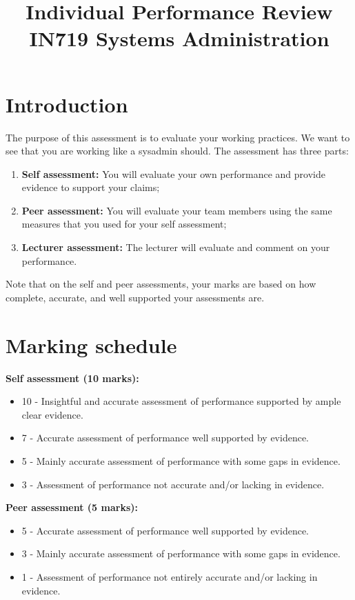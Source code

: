 \documentclass{article}   	%
\title{Individual Performance Review\\ IN719 Systems Administration}
\date{}							%
\begin{document}
\maketitle

\section*{Introduction}
The purpose of this assessment is to evaluate your working practices.  We want to see that you are working like a sysadmin should.  The assessment has three parts:

\begin{enumerate}
  \item  \textbf{Self assessment:}  You will evaluate your own performance and provide evidence to support your claims;
  \item  \textbf{Peer assessment:}  You will evaluate your team members using the same measures that you used for your self assessment;
  \item  \textbf{Lecturer assessment:}  The lecturer will evaluate and comment on your performance.
\end{enumerate}

Note that on the self and peer assessments, your marks are based on how complete, accurate, and well supported your assessments are.

\section*{Marking schedule}
\textbf{Self assessment (10 marks):}

\begin{itemize}
  \item 10 - Insightful and accurate assessment of performance supported by ample clear evidence.
  \item 7 - Accurate assessment of performance well supported by evidence.
  \item 5 - Mainly accurate assessment of performance with some gaps in evidence.
  \item 3 - Assessment of performance not accurate and/or lacking in evidence.
\end{itemize}

\textbf{Peer assessment (5 marks):}

\begin{itemize}
  \item 5 - Accurate assessment of performance well supported by evidence.
  \item 3 - Mainly accurate assessment of performance with some gaps in evidence.
  \item 1 - Assessment of performance not entirely accurate and/or lacking in evidence.
\end{itemize}
\end{document}
